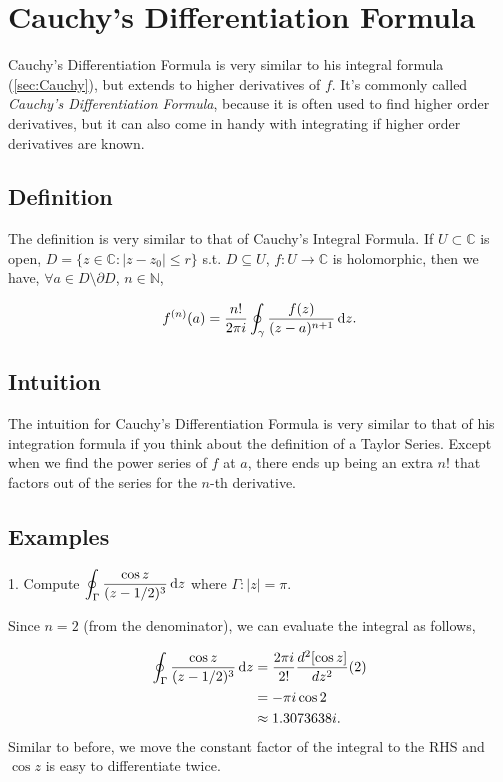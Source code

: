 \section{Cauchy's Differentiation Formula}\label{sec:cauchydifferentiation}

Cauchy's Differentiation Formula is very similar to his integral formula (\ref{sec:Cauchy}), but extends to higher derivatives of $f$. It's commonly called \textit{Cauchy's Differentiation Formula}, because it is often used to find higher order derivatives, but it can also come in handy with integrating if higher order derivatives are known.

\subsection*{Definition}

The definition is very similar to that of Cauchy's Integral Formula. If $U \subset \mathbb C$ is open, $D = \{ z \in \mathbb C : |z-z_0|\le r\}$ s.t. $D\subseteq U$, $f:U\to \mathbb C$ is holomorphic, then we have, $\forall a\in D\setminus\partial D$, $n \in\mathbb N$,

$$ f^{(n)}(a) = \frac{n!}{2\pi i} \oint_\gamma \frac{f(z)}{(z-a)^{n+1}}\, \textrm{d}z .$$

\subsection*{Intuition}

The intuition for Cauchy's Differentiation Formula is very similar to that of his integration formula if you think about the definition of a Taylor Series. Except when we find the power series of $f$ at $a$, there ends up being an extra $n!$ that factors out of the series for the $n$-th derivative. 

\subsection*{Examples}

1. Compute $\displaystyle \oint_\Gamma \frac{\cos z}{(z-1/2)^{3}}\,\textrm{d}z$ where $\Gamma : |z|=\pi$.

\begin{ExampleBody}
    Since $n=2$ (from the denominator), we can evaluate the integral as follows,
    
    \begin{align}
        \oint_\Gamma \frac{\cos z}{(z-1/2)^3}\,\textrm{d}z &= \frac{2\pi i}{2!} \frac{d^2 [\cos z]}{dz^2}(2) \\
        &= -\pi i\cos 2 \nonumber \\
        &\approx 1.3073638i \nonumber.
    \end{align}
    Similar to before, we move the constant factor of the integral to the RHS and $\cos z$ is easy to differentiate twice.
\end{ExampleBody}

